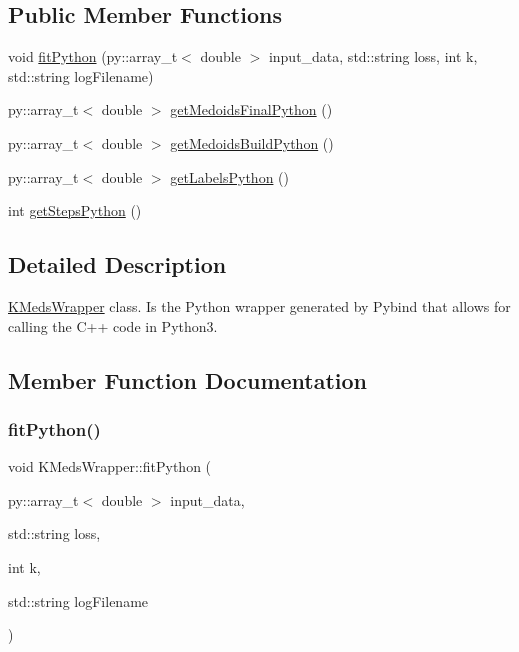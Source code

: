 \subsection*{Public Member Functions}
\begin{DoxyCompactItemize}
\item 
void \hyperlink{classKMedsWrapper_ac0311bd5d2aef638cf794e4412426d3c}{fit\+Python} (py\+::array\+\_\+t$<$ double $>$ input\+\_\+data, std\+::string loss, int k, std\+::string log\+Filename)
\item 
py\+::array\+\_\+t$<$ double $>$ \hyperlink{classKMedsWrapper_ae825241c43b8bf92912eb59cd12ae1c5}{get\+Medoids\+Final\+Python} ()
\item 
py\+::array\+\_\+t$<$ double $>$ \hyperlink{classKMedsWrapper_af272debff6f3b31490d20b8dc7bec322}{get\+Medoids\+Build\+Python} ()
\item 
py\+::array\+\_\+t$<$ double $>$ \hyperlink{classKMedsWrapper_aba0a92e75230b7853fd533657ead656e}{get\+Labels\+Python} ()
\item 
int \hyperlink{classKMedsWrapper_a25ac2830354eeae7963cdec34d0137e8}{get\+Steps\+Python} ()
\end{DoxyCompactItemize}


\subsection{Detailed Description}
\hyperlink{classKMedsWrapper}{K\+Meds\+Wrapper} class. Is the Python wrapper generated by Pybind that allows for calling the C++ code in Python3. 

\subsection{Member Function Documentation}
\mbox{\label{classKMedsWrapper_ac0311bd5d2aef638cf794e4412426d3c}} 
\subsubsection{\texorpdfstring{fit\+Python()}{fitPython()}}
{\footnotesize\ttfamily void K\+Meds\+Wrapper\+::fit\+Python (\begin{DoxyParamCaption}\item[{py\+::array\+\_\+t$<$ double $>$}]{input\+\_\+data,  }\item[{std\+::string}]{loss,  }\item[{int}]{k,  }\item[{std\+::string}]{log\+Filename }\end{DoxyParamCaption})\hspace{0.3cm}{\ttfamily [inline]}}

